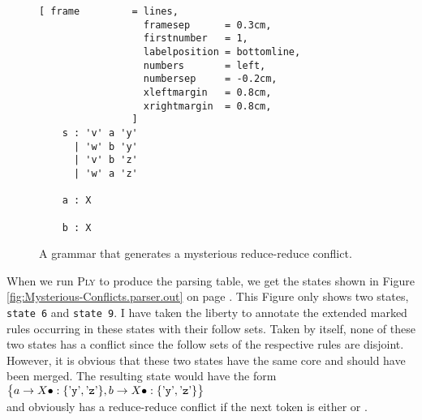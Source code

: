 \begin{figure}[!ht]
\centering
\begin{Verbatim}[ frame         = lines, 
                  framesep      = 0.3cm, 
                  firstnumber   = 1,
                  labelposition = bottomline,
                  numbers       = left,
                  numbersep     = -0.2cm,
                  xleftmargin   = 0.8cm,
                  xrightmargin  = 0.8cm,
                ]
    s : 'v' a 'y'
      | 'w' b 'y'
      | 'v' b 'z'
      | 'w' a 'z'
      
    a : X
    
    b : X
\end{Verbatim}
\vspace*{-0.3cm}
\caption{A grammar that generates a mysterious reduce-reduce conflict.}
\label{fig:Mysterious-Conflicts.ipynb}
\end{figure}
\vspace*{0.3cm}

When we run \textsc{Ply} to produce the parsing table, we get the states shown in Figure
\ref{fig:Mysterious-Conflicts.parser.out} on page \pageref{fig:Mysterious-Conflicts.parser.out}.
This Figure only shows two states, \texttt{state 6} and \texttt{state 9}.  I have taken the liberty to annotate
the extended marked rules occurring in these states with their follow sets.  Taken by itself, none of these two
states has a conflict since the follow sets of the respective rules are disjoint.  However, 
it is obvious that these two states have the same core and should have been merged.  The resulting state would
have the form 
\\[0.2cm]
\hspace*{1.3cm}
$\bigl\{ a \rightarrow X \bullet:\{\mbox{'\texttt{y}'}, \mbox{'\texttt{z}'} \},
         b \rightarrow X \bullet:\{\mbox{'\texttt{y}'}, \mbox{'\texttt{z}'} \}
\bigr\}$
\\[0.2cm]
and obviously has a reduce-reduce conflict if the next token is either  or .

